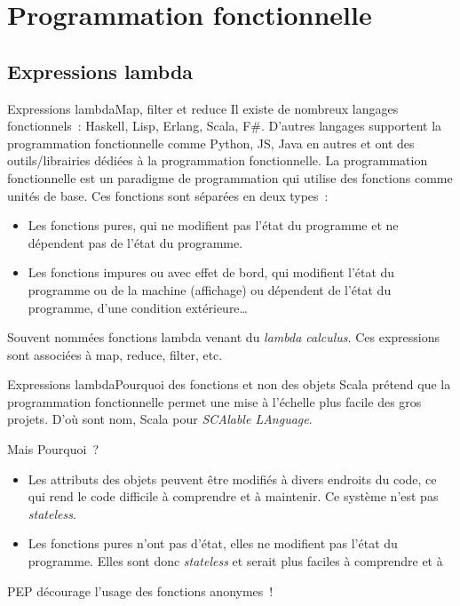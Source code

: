 \documentclass{beamer}
\begin{document}
    \section{Programmation fonctionnelle}

    \subsection{Expressions lambda}
    \begin{frame}[fragile]{Expressions lambda}{Map, filter et reduce}
        Il existe de nombreux langages fonctionnels~: Haskell, Lisp, Erlang, Scala, F\#.
        \bigbreak
        D'autres langages supportent la programmation fonctionnelle comme Python, JS, Java en autres et ont des outils/librairies dédiées à la programmation fonctionnelle.
        \bigbreak
        La programmation fonctionnelle est un paradigme de programmation qui utilise des fonctions comme unités de base.
        Ces fonctions sont séparées en deux types~:
        \begin{itemize}
            \item Les fonctions pures, qui ne modifient pas l'état du programme et ne dépendent pas de l'état du programme.
            \item Les fonctions impures ou avec effet de bord, qui modifient l'état du programme ou de la machine (affichage) ou dépendent de l'état du programme, d'une condition extérieure\ldots{}
        \end{itemize}
        Souvent nommées fonctions lambda venant du \textit{lambda calculus}.
        Ces expressions sont associées à map, reduce, filter, etc.
    \end{frame}

    \begin{frame}{Expressions lambda}{Pourquoi des fonctions et non des objets}
        Scala prétend que la programmation fonctionnelle permet une mise à l'échelle plus facile des gros projets.
        D'où sont nom, Scala pour \textit{SCAlable LAnguage}.

        Mais Pourquoi~?
        \bigbreak
        \begin{itemize}
            \item Les attributs des objets peuvent être modifiés à divers endroits du code, ce qui rend le code difficile à comprendre et à maintenir.
            Ce système n'est pas \textit{stateless}.
            \item Les fonctions pures n'ont pas d'état, elles ne modifient pas l'état du programme.
            Elles sont donc \textit{stateless} et serait plus faciles à comprendre et à
        \end{itemize}
        \begin{dangercolorbox}
            PEP décourage l'usage des fonctions anonymes\footnotemark~!
        \end{dangercolorbox}
    \end{frame}
\end{document}
